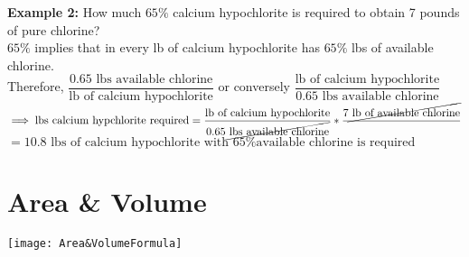 \textbf{Example 2:} How much $65 \%$ calcium hypochlorite is required to obtain 7 pounds of pure chlorine?\\
$65 \%$ implies that in every lb of calcium hypochlorite has $65 \%$ lbs of available chlorine.\\
\vspace{0.2cm}
Therefore, $\dfrac{0.65 \textrm{ lbs available chlorine}}{\textrm{lb of calcium hypochlorite}} $ or conversely $\dfrac{\textrm{lb of calcium hypochlorite}}{0.65 \textrm{ lbs available chlorine}}$\\
\vspace{0.2cm}
$\implies{\textrm{lbs calcium hypchlorite required}}=\dfrac{\textrm{lb of calcium hypochlorite}}{0.65 \cancel{\textrm{ lbs available chlorine}}}*\dfrac{7\cancel{\textrm{ lb of available chlorine}}}{}$\\
\vspace{0.2cm}
$=\boxed{10.8 \textrm{ lbs of calcium hypochlorite with } 65\%\textrm{available chlorine is required}}$


\newpage
\section{Area \& Volume}


\begin{center}
\texttt{[image: Area\&VolumeFormula]}
\end{center}
